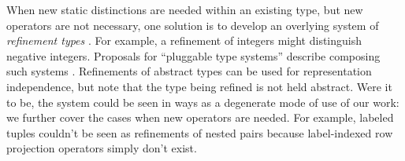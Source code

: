 \documentclass[pldi]{sigplanconf-pldi15}
\begin{document}


When new static distinctions are needed within an existing type, but new operators are not necessary, one solution is to develop an overlying system of \emph{refinement types} \cite{Freeman91}. For example, a refinement of  integers might distinguish negative integers. Proposals for ``pluggable type systems'' describe composing such   systems \cite{Brac04a,Andreae:2006:FIP:1167473.1167479}. Refinements of abstract types can be used for representation independence, but note that the type being refined is not held abstract. %
Were it to be, the system could be seen in ways as a degenerate mode of use of our work: we further cover the cases when new  operators are needed. 
For example, labeled tuples couldn't be seen as refinements of nested pairs because label-indexed row projection operators simply don't exist. %
\end{document}
